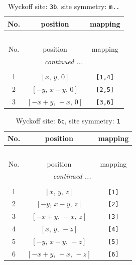\documentclass[fleqn,8pt]{jsarticle}
\begin{document}
\begin{longtable}{ccc}
\caption{Wyckoff site: {\tt 3b}, site symmetry: {\tt m..}}
 \\
 \hline \hline
No. & position & mapping \\ \hline \endfirsthead

\multicolumn{2}{l}{\tablename\ \thetable{}} \\
 \hline \hline
No. & position & mapping \\ \hline \endhead

 \hline \hline
\multicolumn{2}{r}{\footnotesize\it continued ...} \\ \endfoot

 \hline \hline
\multicolumn{2}{r}{} \\ \endlastfoot

1 & $\left[ x,\, y,\, 0 \right]$ & {\tt [1,4]} \\ \hline
2 & $\left[ - y,\, x - y,\, 0 \right]$ & {\tt [2,5]} \\ \hline
3 & $\left[ - x + y,\, - x,\, 0 \right]$ & {\tt [3,6]} \\
\end{longtable}
\renewcommand{\arraystretch}{1.2}
\begin{longtable}{ccc}
\caption{Wyckoff site: {\tt 6c}, site symmetry: {\tt 1}}
 \\
 \hline \hline
No. & position & mapping \\ \hline \endfirsthead

\multicolumn{2}{l}{\tablename\ \thetable{}} \\
 \hline \hline
No. & position & mapping \\ \hline \endhead

 \hline \hline
\multicolumn{2}{r}{\footnotesize\it continued ...} \\ \endfoot

 \hline \hline
\multicolumn{2}{r}{} \\ \endlastfoot

1 & $\left[ x,\, y,\, z \right]$ & {\tt [1]} \\ \hline
2 & $\left[ - y,\, x - y,\, z \right]$ & {\tt [2]} \\ \hline
3 & $\left[ - x + y,\, - x,\, z \right]$ & {\tt [3]} \\ \hline
4 & $\left[ x,\, y,\, - z \right]$ & {\tt [4]} \\ \hline
5 & $\left[ - y,\, x - y,\, - z \right]$ & {\tt [5]} \\ \hline
6 & $\left[ - x + y,\, - x,\, - z \right]$ & {\tt [6]} \\
\end{longtable}
\end{document}
